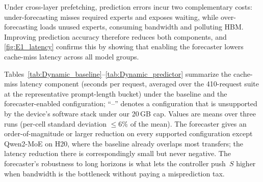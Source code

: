 Under cross-layer prefetching, prediction errors incur two
complementary costs: under-forecasting misses required experts and
exposes waiting, while over-forecasting loads unused experts,
consuming bandwidth and polluting HBM. Improving prediction accuracy
therefore reduces both components, and \autoref{fig:E1_latency}
confirms this by showing that enabling the forecaster lowers
cache-miss latency across all model groups.

Tables~\ref{tab:Dynamic_baseline}--\ref{tab:Dynamic_predictor}
summarize the cache-miss latency component (seconds per request,
averaged over the 410-request suite at the representative
prompt-length bucket) under the baseline and the forecaster-enabled
configuration; ``--'' denotes a configuration that is unsupported
by the device's software stack under our 20\,GB cap. Values are
means over three runs (per-cell standard deviation $\le 6\%$ of the
mean). The forecaster gives an order-of-magnitude or larger
reduction on every supported configuration except Qwen2-MoE on H20,
where the baseline already overlaps most transfers; the latency
reduction there is correspondingly small but never negative. The
forecaster's robustness to long horizons is what lets the controller
push~$S$ higher when bandwidth is the bottleneck without paying a
misprediction tax.

\begin{table}[t]
\centering
\renewcommand{\arraystretch}{1.2}
\caption{Cache-miss latency (s/request) under the fixed-horizon baseline.}
\label{tab:Dynamic_baseline}
\end{table}

\begin{table}[t]
\centering
\renewcommand{\arraystretch}{1.2}
\caption{Cache-miss latency (s/request) with the Predictor enabled.
Reductions are largest where expert transfer dominates the critical
path; on configurations where the baseline already overlaps most
transfers (e.g., Qwen2-MoE on H20) the headroom is smaller, as expected.}
\label{tab:Dynamic_predictor}
\end{table}

